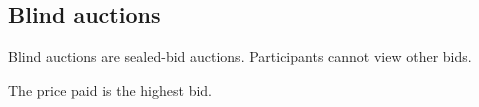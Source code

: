 
\subsection{Blind auctions}

Blind auctions are sealed-bid auctions. Participants cannot view other bids.

The price paid is the highest bid.

